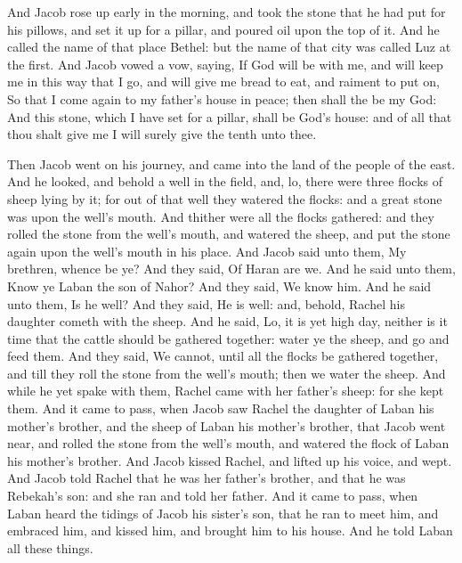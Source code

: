 \begin{biblechapter}
\verse And Jacob rose up early in the morning, and took the stone that he had put for his pillows, and set it up for a pillar, and poured oil upon the top of it.
\verse And he called the name of that place Bethel: but the name of that city was called Luz at the first.
\verse And Jacob vowed a vow, saying, If God will be with me, and will keep me in this way that I go, and will give me bread to eat, and raiment to put on,
\verse So that I come again to my father's house in peace; then shall the \LORD be my God:
\verse And this stone, which I have set for a pillar, shall be God's house: and of all that thou shalt give me I will surely give the tenth unto thee.
\end{biblechapter}

\begin{biblechapter} %
 Then Jacob went on his journey, and came into the land of the people of the east.
\verse And he looked, and behold a well in the field, and, lo, there were three flocks of sheep lying by it; for out of that well they watered the flocks: and a great stone was upon the well's mouth.
\verse And thither were all the flocks gathered: and they rolled the stone from the well's mouth, and watered the sheep, and put the stone again upon the well's mouth in his place.
\verse And Jacob said unto them, My brethren, whence be ye? And they said, Of Haran are we.
\verse And he said unto them, Know ye Laban the son of Nahor? And they said, We know him.
\verse And he said unto them, Is he well? And they said, He is well: and, behold, Rachel his daughter cometh with the sheep.
\verse And he said, Lo, it is yet high day, neither is it time that the cattle should be gathered together: water ye the sheep, and go and feed them.
\verse And they said, We cannot, until all the flocks be gathered together, and till they roll the stone from the well's mouth; then we water the sheep.
\verse And while he yet spake with them, Rachel came with her father's sheep: for she kept them.
\verse And it came to pass, when Jacob saw Rachel the daughter of Laban his mother's brother, and the sheep of Laban his mother's brother, that Jacob went near, and rolled the stone from the well's mouth, and watered the flock of Laban his mother's brother.
\verse And Jacob kissed Rachel, and lifted up his voice, and wept.
\verse And Jacob told Rachel that he was her father's brother, and that he was Rebekah's son: and she ran and told her father.
\verse And it came to pass, when Laban heard the tidings of Jacob his sister's son, that he ran to meet him, and embraced him, and kissed him, and brought him to his house. And he told Laban all these things.

\end{biblechapter}
